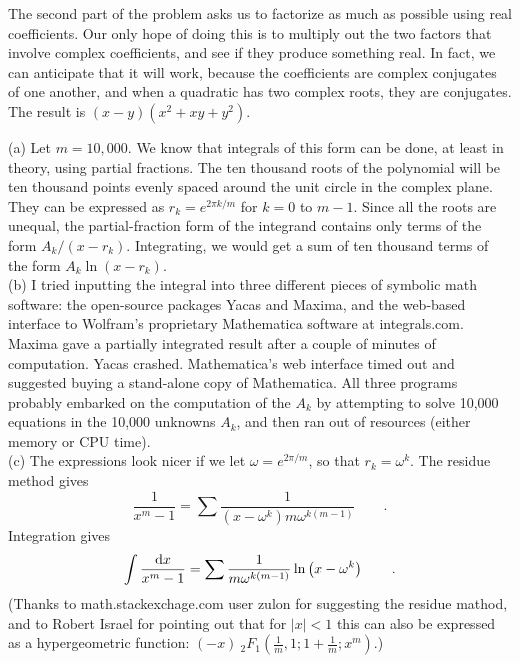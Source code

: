 The second part of the problem asks us to factorize as much as possible using real coefficients.
Our only hope of doing this is to multiply out the two factors that involve complex coefficients,
and see if they produce something real. In fact, we can anticipate that it will work, because
the coefficients are complex conjugates of one another, and when a quadratic has two complex
roots, they are conjugates. The result is $(x-y)(x^2+xy+y^2)$.

(a) Let $m=10,000$. We know that integrals of this form can be done, at least in theory, using partial fractions.
The ten thousand roots of the polynomial will be ten thousand points evenly spaced around
the unit circle in the complex plane. They can be expressed as $r_k=e^{2\pi k/m}$ for $k=0$ to $m-1$.
Since all the roots are unequal, the partial-fraction form of the integrand contains only terms
of the form $A_k/(x-r_k)$. Integrating, we would get a sum of ten thousand terms of the form
$A_k\ln(x-r_k)$.\\
(b) I tried inputting the integral into three different pieces of symbolic
math software: the open-source packages Yacas and Maxima, and the web-based interface to
Wolfram's proprietary Mathematica software at integrals.com. Maxima gave a partially integrated result after a couple
of minutes of computation. Yacas crashed. Mathematica's web interface timed out and suggested
buying a stand-alone copy of Mathematica. All three programs probably embarked on the computation
of the $A_k$ by attempting to solve 10,000 equations in the 10,000 unknowns $A_k$, and then ran out
of resources (either memory or CPU time).\\
(c) The expressions look nicer if we let $\omega=e^{2\pi/m}$, so that $r_k=\omega^k$. The residue method gives
\begin{equation*}
  \frac{1}{x^m-1} = \sum \frac{1}{(x-\omega^k)m \omega^{k(m-1)}} \qquad .
\end{equation*}
Integration gives
\begin{equation*}
  \int \frac{\textup{d} x}{x^m-1} = \sum \frac{1}{m \omega^{k(m-1)}}\ln\left(x-\omega^k\right) \qquad .
\end{equation*}
(Thanks to math.stackexchage.com user zulon for suggesting the residue mathod, and to
Robert Israel for pointing out that for $|x|<1$ this can also be expressed as a hypergeometric function:
$(- x)\ {}_2F_1\left(\frac{1}{m},1; 1+\frac{1}{m}; x^m\right)$.)
